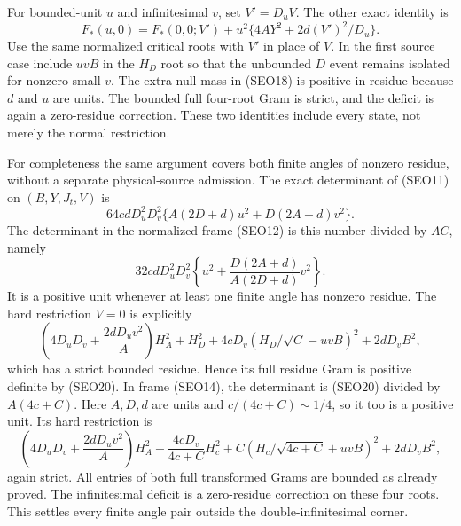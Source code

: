 For bounded-unit $u$ and infinitesimal $v$, set $V'=D_uV$.
The other exact identity is
\[
 F_*(u,0)=F_*(0,0;V')
        +u^2\{4AY^2+2d(V')^2/D_u\}.             \tag{SEO18}
\]
Use the same normalized critical roots with $V'$ in place of $V$.
In the first source case include $uvB$ in the $H_D$ root so that
the unbounded $D$ event remains isolated for nonzero small $v$.
The extra null mass in (SEO18) is positive in residue because
$d$ and $u$ are units. The bounded full four-root Gram is strict,
and the deficit is again a zero-residue correction. These two
identities include every state, not merely the normal restriction.

For completeness the same argument covers both finite angles of
nonzero residue, without a separate physical-source admission.
The exact determinant of (SEO11) on $(B,Y,J_t,V)$ is
\[
 64cdD_u^2D_v^2
 \{A(2D+d)u^2+D(2A+d)v^2\}.                    \tag{SEO20}
\]
The determinant in the normalized frame (SEO12) is this number
divided by $AC$, namely
\[
 32cdD_u^2D_v^2
 \left\{u^2+\frac{D(2A+d)}{A(2D+d)}v^2\right\}.
\]
It is a positive unit whenever at least one finite angle has
nonzero residue. The hard restriction $V=0$ is explicitly
\[
 \left(4D_uD_v+\frac{2dD_uv^2}{A}\right)H_A^2
 +H_D^2+4cD_v(H_D/\sqrt C-uvB)^2+2dD_vB^2,
\]
which has a strict bounded residue. Hence its full residue Gram
is positive definite by (SEO20). In frame (SEO14), the determinant
is (SEO20) divided by $A(4c+C)$. Here $A,D,d$ are units and
$c/(4c+C)\sim1/4$, so it too is a positive unit. Its hard
restriction is
\[
 \left(4D_uD_v+\frac{2dD_uv^2}{A}\right)H_A^2
 +\frac{4cD_v}{4c+C}H_c^2
 +C(H_c/\sqrt{4c+C}+uvB)^2+2dD_vB^2,
\]
again strict. All entries of both full transformed Grams are
bounded as already proved. The infinitesimal deficit is a
zero-residue correction on these four roots. This settles every
finite angle pair outside the double-infinitesimal corner.

